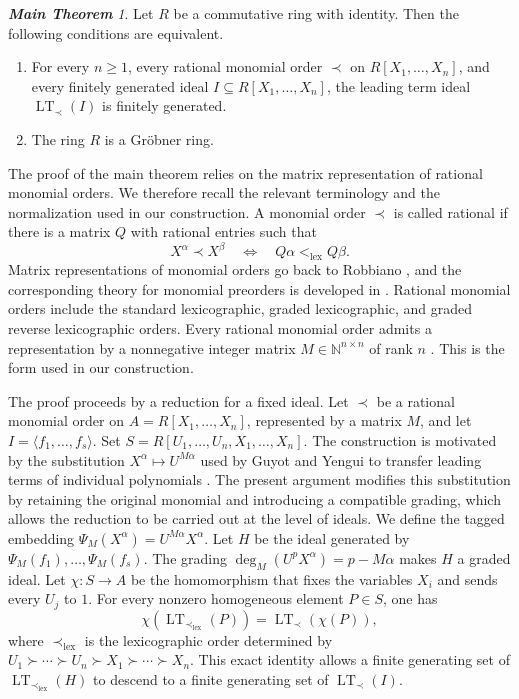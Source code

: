 \documentclass[preprint,12pt,3p]{elsarticle}
\theoremstyle{definition}
\theoremstyle{remark}
\newtheorem*{maintheorem}{\bf Main Theorem}
\newcommand{\LT}{\operatorname{LT}}
\begin{document}
	\begin{maintheorem}
		\label{thm:rational-grobner-characterization}
		Let $R$ be a commutative ring with identity. Then the following
		conditions are equivalent.
		\begin{enumerate}
			\item[(1)] For every $n\geq 1$, every rational monomial order
			$\prec$ on $R[X_1,\ldots,X_n]$, and every finitely generated
			ideal $I\subseteq R[X_1,\ldots,X_n]$, the leading term ideal
			$\LT_\prec(I)$ is finitely generated.
			
			\item[(2)] The ring $R$ is a Gr\"obner ring.
		\end{enumerate}
	\end{maintheorem}
	
	The proof of the main theorem relies on the matrix representation of
	rational monomial orders. We therefore recall the relevant
	terminology and the normalization used in our construction.
	A monomial order $\prec$ is called rational if there is a matrix $Q$
	with rational entries such that
	\[
	X^\alpha\prec X^\beta
	\quad\Longleftrightarrow\quad
	Q\alpha<_{\mathrm{lex}}Q\beta.
	\]
	Matrix representations of monomial orders go back to Robbiano
	\cite{Robbiano1985,Robbiano1986}, and the corresponding theory for
	monomial preorders is developed in \cite{KemperTrungAnh2018}.
	Rational monomial orders include the standard lexicographic, graded
	lexicographic, and graded reverse lexicographic orders. Every rational
	monomial order admits a representation by a nonnegative integer
	matrix $M\in\mathbb N^{n\times n}$ of rank $n$
	\cite{KemperYengui2020,GuyotYengui2024}. This is the form used in our
	construction.
	
The proof proceeds by a reduction for a fixed ideal. Let $\prec$ be a
rational monomial order on $A=R[X_1,\ldots,X_n]$, represented by a
matrix $M$, and let $I=\langle f_1,\ldots,f_s\rangle$. Set
$S=R[U_1,\ldots,U_n,X_1,\ldots,X_n]$. The construction is motivated
by the substitution $X^\alpha\mapsto U^{M\alpha}$ used by Guyot and
Yengui to transfer leading terms of individual polynomials
\cite{GuyotYengui2024}.  The present
argument modifies this substitution by retaining the original monomial
and introducing a compatible grading, which allows the reduction to be
carried out at the level of ideals. We define the tagged embedding
$\Psi_M(X^\alpha)=U^{M\alpha}X^\alpha$. Let $H$ be the ideal generated
by $\Psi_M(f_1),\ldots,\Psi_M(f_s)$. The grading $\deg_M(U^pX^\alpha)=p-M\alpha$ makes $H$ a graded ideal.
Let $\chi\colon S\to A$ be the homomorphism that fixes the variables
$X_i$ and sends every $U_j$ to $1$. For every nonzero homogeneous
element $P\in S$, one has
\[
\chi\!\left(\LT_{\prec_{\mathrm{lex}}}(P)\right)
=
\LT_\prec\!\left(\chi(P)\right),
\]
where $\prec_{\mathrm{lex}}$ is the lexicographic order determined by
$U_1\succ\cdots\succ U_n\succ X_1\succ\cdots\succ X_n$. This exact
identity allows a finite generating set of
$\LT_{\prec_{\mathrm{lex}}}(H)$ to descend to a finite generating set
of $\LT_\prec(I)$.
	
\end{document}
